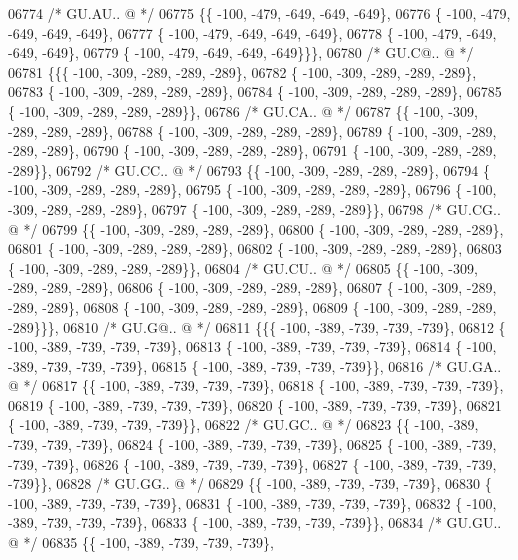 \begin{DoxyCode}
06774 \textcolor{comment}{/* GU.AU.. @ */}
06775 \{\{ -100, -479, -649, -649, -649\},
06776 \{ -100, -479, -649, -649, -649\},
06777 \{ -100, -479, -649, -649, -649\},
06778 \{ -100, -479, -649, -649, -649\},
06779 \{ -100, -479, -649, -649, -649\}\}\},
06780 \textcolor{comment}{/* GU.C@.. @ */}
06781 \{\{\{ -100, -309, -289, -289, -289\},
06782 \{ -100, -309, -289, -289, -289\},
06783 \{ -100, -309, -289, -289, -289\},
06784 \{ -100, -309, -289, -289, -289\},
06785 \{ -100, -309, -289, -289, -289\}\},
06786 \textcolor{comment}{/* GU.CA.. @ */}
06787 \{\{ -100, -309, -289, -289, -289\},
06788 \{ -100, -309, -289, -289, -289\},
06789 \{ -100, -309, -289, -289, -289\},
06790 \{ -100, -309, -289, -289, -289\},
06791 \{ -100, -309, -289, -289, -289\}\},
06792 \textcolor{comment}{/* GU.CC.. @ */}
06793 \{\{ -100, -309, -289, -289, -289\},
06794 \{ -100, -309, -289, -289, -289\},
06795 \{ -100, -309, -289, -289, -289\},
06796 \{ -100, -309, -289, -289, -289\},
06797 \{ -100, -309, -289, -289, -289\}\},
06798 \textcolor{comment}{/* GU.CG.. @ */}
06799 \{\{ -100, -309, -289, -289, -289\},
06800 \{ -100, -309, -289, -289, -289\},
06801 \{ -100, -309, -289, -289, -289\},
06802 \{ -100, -309, -289, -289, -289\},
06803 \{ -100, -309, -289, -289, -289\}\},
06804 \textcolor{comment}{/* GU.CU.. @ */}
06805 \{\{ -100, -309, -289, -289, -289\},
06806 \{ -100, -309, -289, -289, -289\},
06807 \{ -100, -309, -289, -289, -289\},
06808 \{ -100, -309, -289, -289, -289\},
06809 \{ -100, -309, -289, -289, -289\}\}\},
06810 \textcolor{comment}{/* GU.G@.. @ */}
06811 \{\{\{ -100, -389, -739, -739, -739\},
06812 \{ -100, -389, -739, -739, -739\},
06813 \{ -100, -389, -739, -739, -739\},
06814 \{ -100, -389, -739, -739, -739\},
06815 \{ -100, -389, -739, -739, -739\}\},
06816 \textcolor{comment}{/* GU.GA.. @ */}
06817 \{\{ -100, -389, -739, -739, -739\},
06818 \{ -100, -389, -739, -739, -739\},
06819 \{ -100, -389, -739, -739, -739\},
06820 \{ -100, -389, -739, -739, -739\},
06821 \{ -100, -389, -739, -739, -739\}\},
06822 \textcolor{comment}{/* GU.GC.. @ */}
06823 \{\{ -100, -389, -739, -739, -739\},
06824 \{ -100, -389, -739, -739, -739\},
06825 \{ -100, -389, -739, -739, -739\},
06826 \{ -100, -389, -739, -739, -739\},
06827 \{ -100, -389, -739, -739, -739\}\},
06828 \textcolor{comment}{/* GU.GG.. @ */}
06829 \{\{ -100, -389, -739, -739, -739\},
06830 \{ -100, -389, -739, -739, -739\},
06831 \{ -100, -389, -739, -739, -739\},
06832 \{ -100, -389, -739, -739, -739\},
06833 \{ -100, -389, -739, -739, -739\}\},
06834 \textcolor{comment}{/* GU.GU.. @ */}
06835 \{\{ -100, -389, -739, -739, -739\},

\end{DoxyCode}
